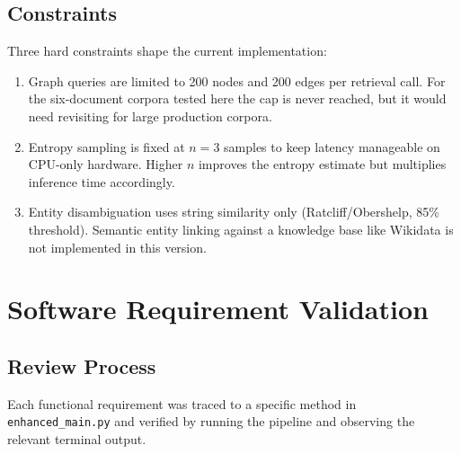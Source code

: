 \subsection{Constraints}

Three hard constraints shape the current implementation:

\begin{enumerate}
    \item Graph queries are limited to 200 nodes and 200 edges per retrieval
    call. For the six-document corpora tested here the cap is never reached,
    but it would need revisiting for large production corpora.
    \item Entropy sampling is fixed at $n=3$ samples to keep latency
    manageable on CPU-only hardware. Higher $n$ improves the entropy estimate
    but multiplies inference time accordingly.
    \item Entity disambiguation uses string similarity only
    (Ratcliff/Obershelp, 85\% threshold). Semantic entity linking against a
    knowledge base like Wikidata is not implemented in this version.
\end{enumerate}

\section{Software Requirement Validation}

\subsection{Review Process}

Each functional requirement was traced to a specific method in
\texttt{enhanced\_main.py} and verified by running the pipeline and
observing the relevant terminal output.

